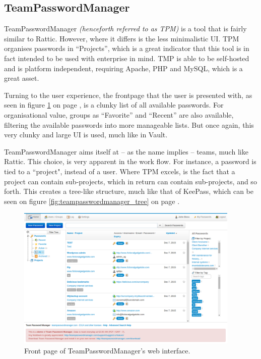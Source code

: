 		\subsection*{TeamPasswordManager}
			TeamPasswordManager\cite{teampasswordmanager_frontpage} \emph{(henceforth referred to as TPM)} is a tool that is fairly similar to Rattic. However, where it differs is the less minimalistic UI. TPM organises passwords in ``Projects'', which is a great indicator that this tool is in fact intended to be used with enterprise in mind. TMP is able to be self-hosted and is platform independent, requiring Apache, PHP and MySQL, which is a great asset.

			Turning to the user experience, the frontpage that the user is presented with, as seen in figure \ref{fig:teampasswordmanager_main} on page \pageref{fig:teampasswordmanager_main}, is a clunky list of all available passwords. For organisational value, groups as ``Favorite'' and ``Recent'' are also available, filtering the available passwords into more manageable lists. But once again, this very clunky and large UI is used, much like in Vault.

			TeamPasswordManager aims itself at -- as the name implies -- teams, much like Rattic. This choice, is very apparent in the work flow. For instance, a password is tied to a ``project", instead of a user. Where TPM excels, is the fact that a project can contain sub-projects, which in return can contain sub-projects, and so forth. This creates a tree-like structure, much like that of KeePass, which can be seen on figure \ref{fig:teampasswordmanager_tree} on page \pageref{fig:teampasswordmanager_tree}.


			\begin{figure}[htbp]
				\centering
				\includegraphics[width=0.95\textwidth]{figures/analysis/teampasswordmanager_main.png}
				\caption{Front page of TeamPasswordManager's web interface.}
				\label{fig:teampasswordmanager_main}
			\end{figure}

